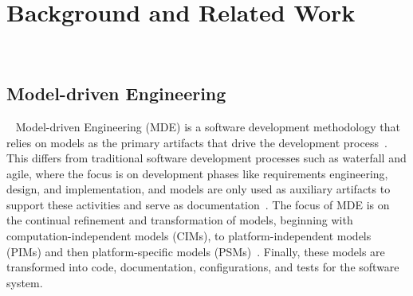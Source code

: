 \section{Background and Related Work}~\label{sec:background}
\subsection{Model-driven Engineering}~\label{subsec:MDEBackground}
Model-driven Engineering (MDE) is a software development methodology that relies on models as the primary artifacts that drive the development process~\cite{ciccozzi2019execution, almonte2021recommender,hutchinson2011model}. This differs from traditional software development processes such as waterfall and agile, where the focus is on development phases like requirements engineering, design, and implementation, and models are only used as auxiliary artifacts to support these activities and serve as documentation~\cite{ciccozzi2019execution}. 
The focus of MDE is on the continual refinement and transformation of models, beginning with computation-independent models (CIMs), to platform-independent models (PIMs) and then platform-specific models (PSMs)~\cite{brambilla2017model}. Finally, these models are transformed into code, documentation, configurations, and tests for the software system.

